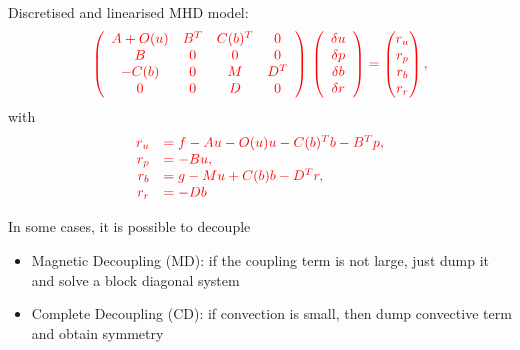 \documentclass[12pt]{beamer}
\newcommand{\re}[1]{{\textcolor{red}       {#1}}}
\begin{document}
\begin{frame}
Discretised and linearised MHD model:
\begin{equation}
\nonumber %
\re{\left(
\begin{array}{cccc}
A+O(u) & B^T & C(b)^T & 0\\
B & 0 & 0 & 0 \\
-C(b) & 0 & M & D^T\\
0 & 0 & D & 0
\end{array}
\right)
\,
\left(
\begin{array}{c}
\delta u\\
\delta p\\
\delta b\\
\delta r
\end{array}
\right)  =
\begin{pmatrix}
r_u \\
r_p\\
r_b\\
r_r
\end{pmatrix},}
\end{equation}
with
\begin{equation}\nonumber
\re{\begin{array}{rl}
r_u &= f- Au -O(u) u - C(b)^T b- B^T p,\\
r_p &=-B u,\\
r_b &=g-Mu+C(b)b-D^T r,\\
r_r &=-D b
\end{array}}
\end{equation}

\vspace{2mm}
\pause
In some cases, it is possible to decouple
\begin{itemize}
\item Magnetic Decoupling (MD): if the coupling term is not large, just dump it and solve a block diagonal system
\item Complete Decoupling (CD): if convection is small, then dump convective term and obtain symmetry
\end{itemize}

  \end{frame}
\end{document}
